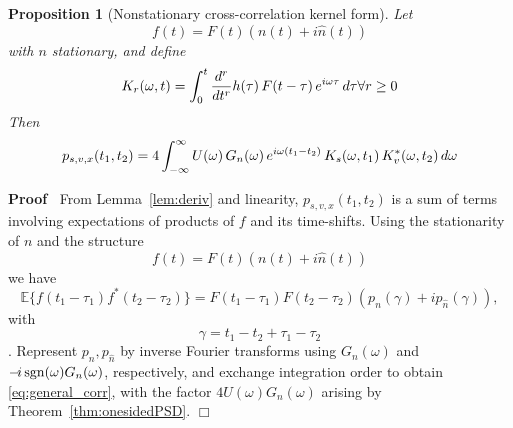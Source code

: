 \documentclass{article}
\newenvironment{proof}{\noindent\textbf{Proof\ }}{\hspace*{\fill}$\Box$\medskip}
\newtheorem{proposition}{Proposition}
\begin{document}
\begin{proposition}
  [Nonstationary cross-correlation kernel form]\label{prop:kernel} Let
  \begin{equation}
    f (t) = F (t)  (n (t) + i \hat{n} (t))
  \end{equation}
  with $n$ stationary, and define
  \begin{equation}
    K_r (\omega, t) = \int_0^t \frac{d^r}{dt^r} h (\tau)  \hspace{0.17em} F (t
    - \tau)  \hspace{0.17em} e^{i \omega \tau}  \hspace{0.17em} d \tau \forall
    r \ge 0
  \end{equation}
  Then
  \begin{equation}
    \label{eq:general_corr} p_{s, v, x} (t_1, t_2) = 4 \int_{-
    \infty}^{\infty} U (\omega)  \hspace{0.17em} G_n (\omega)  \hspace{0.17em}
    e^{i \omega (t_1 - t_2)}  \hspace{0.17em} K_s (\omega, t_1) 
    \hspace{0.17em} K_v^{\ast} (\omega, t_2)  \hspace{0.17em} d \omega
  \end{equation}
\end{proposition}

\begin{proof}
  From Lemma~\ref{lem:deriv} and linearity, $p_{s, v, x} (t_1, t_2)$ is a sum
  of terms involving expectations of products of $f$ and its time-shifts.
  Using the stationarity of $n$ and the structure
  \begin{equation}
    f (t) = F (t)  (n (t) + i \hat{n} (t))
  \end{equation}
  we have
  \begin{equation}
    \mathbb{E} \{f (t_1 - \tau_1) f^{\ast} (t_2 - \tau_2)\} = F (t_1 - \tau_1)
    F (t_2 - \tau_2)  (p_n (\gamma) + ip_{\hat{n}} (\gamma)),
  \end{equation}
  with
  \begin{equation}
    \gamma = t_1 - t_2 + \tau_1 - \tau_2
  \end{equation}
  . Represent $p_n, p_{\hat{n}}$ by inverse Fourier transforms using $G_n
  (\omega)$ and $- \hspace{-0.17em} i \hspace{0.17em} \mathrm{sgn} (\omega)
  G_n (\omega)$, respectively, and exchange integration order to obtain
  \eqref{eq:general_corr}, with the factor $4 U (\omega) G_n (\omega)$ arising
  by Theorem~\ref{thm:onesidedPSD}.
\end{proof}
\end{document}
